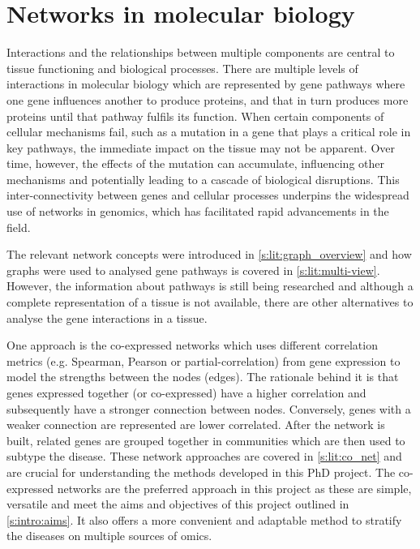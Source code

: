 \section{Networks in molecular biology} \label{s:lit:nets_bio}

\vspace{3mm}
\vspace{3mm}

Interactions and the relationships between multiple components are central to tissue functioning and biological processes. There are multiple levels of interactions in molecular biology which are represented by gene pathways where one gene influences another to produce proteins, and that in turn produces more proteins until that pathway fulfils its function. When certain components of cellular mechanisms fail, such as a mutation in a gene that plays a critical role in key pathways, the immediate impact on the tissue may not be apparent. Over time, however, the effects of the mutation can accumulate, influencing other mechanisms and potentially leading to a cascade of biological disruptions. This inter-connectivity between genes and cellular processes underpins the widespread use of networks in genomics, which has facilitated rapid advancements in the field.

The relevant network concepts were introduced in \cref{s:lit:graph_overview} and how graphs were used to analysed gene pathways is covered in \cref{s:lit:multi-view}. However, the information about pathways is still being researched and although a complete representation of a tissue is not available, there are other alternatives to analyse the gene interactions in a tissue.

One approach is the co-expressed networks which uses different correlation metrics (e.g. Spearman, Pearson or partial-correlation) from gene expression to model the strengths between the nodes (edges). The rationale behind it is that genes expressed together (or co-expressed) have a higher correlation and subsequently have a stronger connection between nodes. Conversely, genes with a weaker connection are represented are lower correlated. After the network is built, related genes are grouped together in communities which are then used to subtype the disease. These network approaches are covered in \cref{s:lit:co_net} and are crucial for understanding the methods developed in this PhD project. The co-expressed networks are the preferred approach in this project as these are simple, versatile and meet the aims and objectives of this project outlined in \cref{s:intro:aims}. It also offers a more convenient and adaptable method to stratify the diseases on multiple sources of omics.

